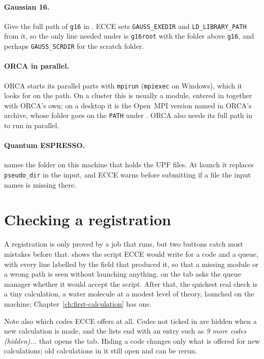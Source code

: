 \paragraph{Gaussian 16.} Give the full path of \texttt{g16} in . ECCE sets \texttt{GAUSS\_EXEDIR} and \texttt{LD\_LIBRARY\_PATH} from it, so the only line needed under  is \texttt{g16root} with the folder above \texttt{g16}, and perhaps \texttt{GAUSS\_SCRDIR} for the scratch folder.

\paragraph{ORCA in parallel.} ORCA starts its parallel parts with \texttt{mpirun} (\texttt{mpiexec} on Windows), which it looks for on the path. On a cluster this is usually a module, entered in  together with ORCA's own; on a desktop it is the Open~MPI version named in ORCA's archive, whose folder goes on the \texttt{PATH} under . ORCA also needs its full path in  to run in parallel.

\paragraph{Quantum ESPRESSO.}  names the folder on this machine that holds the UPF files. At launch it replaces \texttt{pseudo\_dir} in the input, and ECCE warns before submitting if a file the input names is missing there.

\section{Checking a registration}
A registration is only proved by a job that runs, but two buttons catch most mistakes before that.  shows the script ECCE would write for a code and a queue, with every line labelled by the field that produced it, so that a missing module or a wrong path is seen without launching anything.  on the  tab asks the queue manager whether it would accept the script. After that, the quickest real check is a tiny calculation, a water molecule at a modest level of theory, launched on the machine; Chapter~\ref{ch:first-calculation} has one.

Note also which codes ECCE offers at all. Codes not ticked in  are hidden when a new calculation is made, and the lists end with an entry such as \emph{9 more codes (hidden)...} that opens the tab. Hiding a code changes only what is offered for new calculations; old calculations in it still open and can be rerun.

